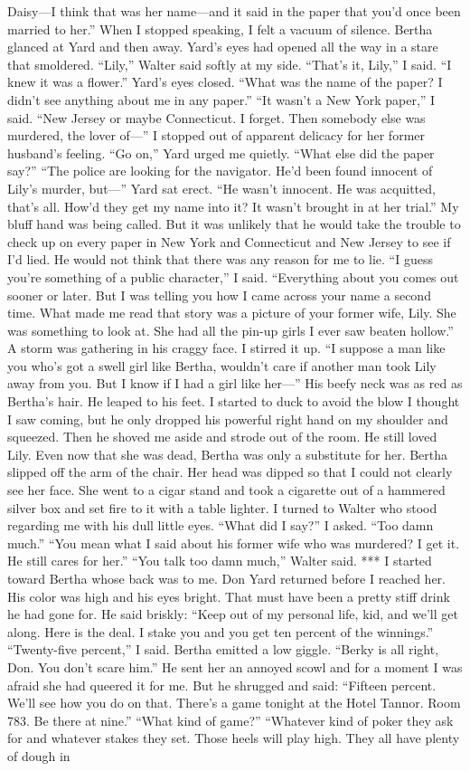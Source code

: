 \documentclass{novel}
\begin{document}
Daisy—I think that was her name—and it said in the paper that you’d once been married to her.” When I stopped speaking, I felt a vacuum of silence. Bertha glanced at Yard and then away. Yard’s eyes had opened all the way in a stare that smoldered. “Lily,” Walter said softly at my side. “That’s it, Lily,” I said. “I knew it was a flower.” Yard’s eyes closed. “What was the name of the paper? I didn’t see anything about me in any paper.” “It wasn’t a New York paper,” I said. “New Jersey or maybe Connecticut. I forget. Then somebody else was murdered, the lover of—” I stopped out of apparent delicacy for her former husband’s feeling. “Go on,” Yard urged me quietly. “What else did the paper say?” “The police are looking for the navigator. He’d been found innocent of Lily’s murder, but—” Yard sat erect. “He wasn’t innocent. He was acquitted, that’s all. How’d they get my name into it? It wasn’t brought in at her trial.” My bluff hand was being called. But it was unlikely that he would take the trouble to check up on every paper in New York and Connecticut and New Jersey to see if I’d lied. He would not think that there was any reason for me to lie. “I guess you’re something of a public character,” I said. “Everything about you comes out sooner or later. But I was telling you how I came across your name a second time. What made me read that story was a picture of your former wife, Lily. She was something to look at. She had all the pin-up girls I ever saw beaten hollow.” A storm was gathering in his craggy face. I stirred it up. “I suppose a man like you who’s got a swell girl like Bertha, wouldn’t care if another man took Lily away from you. But I know if I had a girl like her—” His beefy neck was as red as Bertha’s hair. He leaped to his feet. I started to duck to avoid the blow I thought I saw coming, but he only dropped his powerful right hand on my shoulder and squeezed. Then he shoved me aside and strode out of the room. He still loved Lily. Even now that she was dead, Bertha was only a substitute for her. Bertha slipped off the arm of the chair. Her head was dipped so that I could not clearly see her face. She went to a cigar stand and took a cigarette out of a hammered silver box and set fire to it with a table lighter. I turned to Walter who stood regarding me with his dull little eyes. “What did I say?” I asked. “Too damn much.” “You mean what I said about his former wife who was murdered? I get it. He still cares for her.” “You talk too damn much,” Walter said. *** I started toward Bertha whose back was to me. Don Yard returned before I reached her. His color was high and his eyes bright. That must have been a pretty stiff drink he had gone for. He said briskly: “Keep out of my personal life, kid, and we’ll get along. Here is the deal. I stake you and you get ten percent of the winnings.” “Twenty-five percent,” I said. Bertha emitted a low giggle. “Berky is all right, Don. You don’t scare him.” He sent her an annoyed scowl and for a moment I was afraid she had queered it for me. But he shrugged and said: “Fifteen percent. We’ll see how you do on that. There’s a game tonight at the Hotel Tannor. Room 783. Be there at nine.” “What kind of game?” “Whatever kind of poker they ask for and whatever stakes they set. Those heels will play high. They all have plenty of dough in 
\end{document}
